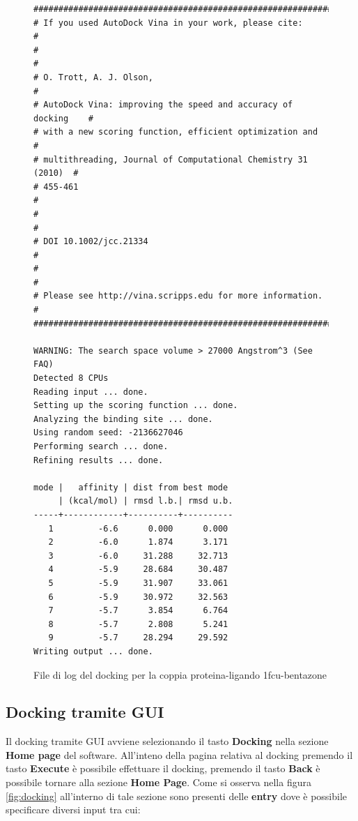 \begin{figure}[H]
\begin{verbatim}
#################################################################
# If you used AutoDock Vina in your work, please cite:          #
#                                                               #
# O. Trott, A. J. Olson,                                        #
# AutoDock Vina: improving the speed and accuracy of docking    #
# with a new scoring function, efficient optimization and       #
# multithreading, Journal of Computational Chemistry 31 (2010)  #
# 455-461                                                       #
#                                                               #
# DOI 10.1002/jcc.21334                                         #
#                                                               #
# Please see http://vina.scripps.edu for more information.      #
#################################################################

WARNING: The search space volume > 27000 Angstrom^3 (See FAQ)
Detected 8 CPUs
Reading input ... done.
Setting up the scoring function ... done.
Analyzing the binding site ... done.
Using random seed: -2136627046
Performing search ... done.
Refining results ... done.

mode |   affinity | dist from best mode
     | (kcal/mol) | rmsd l.b.| rmsd u.b.
-----+------------+----------+----------
   1         -6.6      0.000      0.000
   2         -6.0      1.874      3.171
   3         -6.0     31.288     32.713
   4         -5.9     28.684     30.487
   5         -5.9     31.907     33.061
   6         -5.9     30.972     32.563
   7         -5.7      3.854      6.764
   8         -5.7      2.808      5.241
   9         -5.7     28.294     29.592
Writing output ... done.
\end{verbatim}
\caption{File di log del docking per la coppia proteina-ligando 1fcu-bentazone}
\label{fig:file di log}
\end{figure}

\subsection{Docking tramite GUI}
Il docking tramite GUI avviene selezionando il tasto \textbf{Docking} nella sezione \textbf{Home page} del software. All'inteno della pagina relativa al docking premendo il tasto \textbf{Execute} è possibile effettuare il docking, premendo il tasto \textbf{Back} è possibile tornare alla sezione \textbf{Home Page}.
Come si osserva nella figura \ref{fig:docking} all'interno di tale sezione sono presenti delle \textbf{entry} dove è possibile specificare diversi input tra cui:

